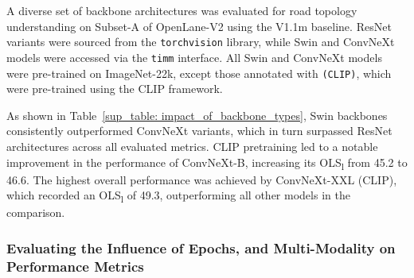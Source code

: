 \begin{table}[t]
\centering
\caption{Performance impact of varying backbone types on road topology understanding in Subset-A of OpenLane-V2, evaluated using the V1.1m baseline.}
\label{sup_table: impact_of_backbone_types}
\end{table}


A diverse set of backbone architectures was evaluated for road topology understanding on Subset-A of OpenLane-V2 using the V1.1m baseline. ResNet variants were sourced from the \texttt{torchvision} library, while Swin and ConvNeXt models were accessed via the \texttt{timm} interface. All Swin and ConvNeXt models were pre-trained on ImageNet-22k, except those annotated with \texttt{(CLIP)}, which were pre-trained using the CLIP framework.

As shown in Table~\ref{sup_table: impact_of_backbone_types}, Swin backbones consistently outperformed ConvNeXt variants, which in turn surpassed ResNet architectures across all evaluated metrics. CLIP pretraining led to a notable improvement in the performance of ConvNeXt-B, increasing its OLS\textsubscript{l} from 45.2 to 46.6. The highest overall performance was achieved by ConvNeXt-XXL (CLIP), which recorded an OLS\textsubscript{l} of 49.3, outperforming all other models in the comparison.

\subsubsection{Evaluating the Influence of Epochs, and Multi-Modality on Performance Metrics}
\label{sup_sec: multi_modality_higher_epoch_regimes}


